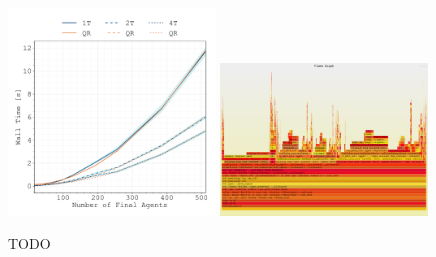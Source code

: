 \documentclass{article}
\begin{document}
\begin{figure}
    \centering
    \includegraphics[width=0.49\textwidth]
        {docs/source/_static/performance/computation-time-with-initial-agents.pdf}
    \includegraphics[width=0.49\textwidth]{docs/source/_static/performance/flamegraph.pdf}
    \caption{TODO}
    \label{fig:performance}
\end{figure}
\end{document}
